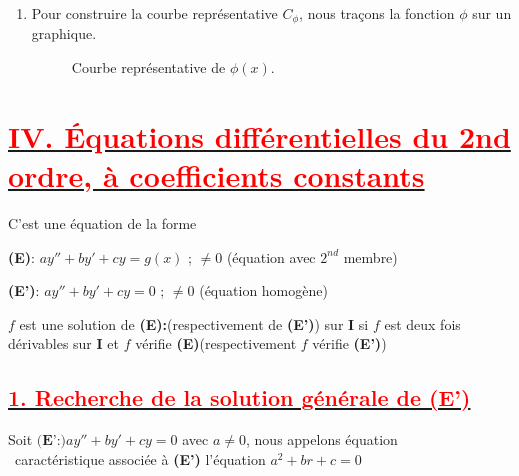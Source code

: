 \documentclass{article}
\begin{document}
\begin{enumerate}
    \item
    Pour construire la courbe représentative $C_{\phi}$, nous traçons la fonction $\phi$ sur un graphique.

    \begin{figure}[h!]
        \centering
        \caption{Courbe représentative de $\phi(x)$.}
    \end{figure}
    
\end{enumerate}
\section*{\underline{\textbf{\textcolor{red}{IV. Équations différentielles du 2nd ordre, à coefficients constants}}}}
C'est une équation de la forme

\textbf{(E)}: $ay''+by'+cy=g(x)$ ; $\neq 0$ (équation avec $2^{nd}$ membre)

\textbf{(E')}: $ay''+by'+cy=0$ ; $\neq 0$ (équation homogène)

$f$ est une solution de \textbf{(E):}(respectivement de \textbf{(E')}) sur \textbf{I} si $f$ est deux fois dérivables sur \textbf{I}  et $f$ vérifie \textbf{(E)}(respectivement $f$ vérifie \textbf{(E')})
\subsection*{\underline{\textbf{\textcolor{red}{1. Recherche de la solution générale de (E')}}}}
Soit $\textbf{(E':)}ay''+by'+cy=0$ avec $a\neq 0$, nous appelons équation\\\ caractéristique associée à \textbf{(E')} l'équation $a^{2}+br+c=0$
\end{document}
